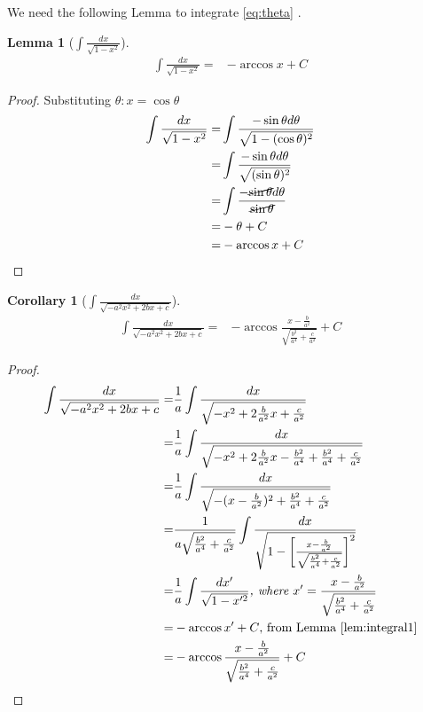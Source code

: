 \documentclass[]{article}
\newtheorem{lemma}[theorem]{Lemma}
\newtheorem{corollary}[theorem]{Corollary}
\begin{document}
We need the following Lemma to integrate \eqref{eq:theta} .
\begin{lemma}[$\int \frac{dx}{\sqrt{1-x^2}}$]\label{lem:integral1}
	\begin{align*}
		\int \frac{dx}{\sqrt{1-x^2}} =& -\arccos x + C
	\end{align*}
\end{lemma}

\begin{proof}
	Substituting $\theta : x=\cos{\theta}$
	\begin{align*}
		\int \frac{dx}{\sqrt{1-x^2}} =& \int \frac{- \sin{\theta} d\theta}{\sqrt{1-(\cos{\theta})^2}}\\
		=&\int \frac{- \sin{\theta} d\theta}{\sqrt{(\sin{\theta})^2}}\\
		=&\int \frac{- \cancel{\sin{\theta}} d\theta}{\cancel{\sin{\theta}}}\\
		=&-\theta + C\\
		=& -\arccos x + C
	\end{align*}
\end{proof}

\begin{corollary}[$\int \frac{dx}{\sqrt{-a^2x^2 + 2bx +c}}$]\label{cor:integral1}
	\begin{align*}
		\int \frac{dx}{\sqrt{-a^2x^2 + 2bx +c}} =& -\arccos{\frac{x-\frac{b}{a^2}}{\sqrt{\frac{b^2}{a^4} +\frac{c}{a^2}}}} + C
	\end{align*}
\end{corollary}

\begin{proof}
	\begin{align*}
		\int \frac{dx}{\sqrt{-a^2x^2 + 2bx +c}} =& \frac{1}{a} \int \frac{dx}{\sqrt{- x^2 + 2\frac{b}{a^2}x +\frac{c}{a^2}}}\\
		=& \frac{1}{a} \int \frac{dx}{\sqrt{- x^2 + 2\frac{b}{a^2}x -\frac{b^2}{a^4} + \frac{b^2}{a^4} +\frac{c}{a^2}}}\\
		=& \frac{1}{a} \int \frac{dx}{\sqrt{- (x-\frac{b}{a^2})^2 +  \frac{b^2}{a^4} +\frac{c}{a^2}}}\\
		=&\frac{1}{a\sqrt{\frac{b^2}{a^4} +\frac{c}{a^2}}}\int \frac{dx}{\sqrt{1-\bigg[\frac{x-\frac{b}{a^2}}{\sqrt{\frac{b^2}{a^4} +\frac{c}{a^2}}}\bigg]^2}}\\
		=& \frac{1}{a} \int \frac{dx^\prime}{\sqrt{1-x^{\prime 2}}} \textit{, where $x^\prime = \frac{x-\frac{b}{a^2}}{\sqrt{\frac{b^2}{a^4} +\frac{c}{a^2}}}$}\\
		=&-\arccos{x^\prime} + C \text{, from Lemma \ref{lem:integral1}}\\
		=&-\arccos{\frac{x-\frac{b}{a^2}}{\sqrt{\frac{b^2}{a^4} +\frac{c}{a^2}}}} + C
	\end{align*}
\end{proof}
\end{document}
